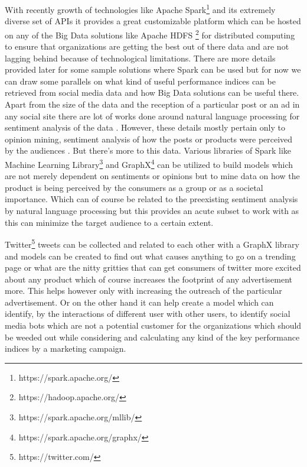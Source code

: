 \documentclass[sigconf]{acmart}
\begin{document}
With recently growth of technologies like Apache Spark\footnote{https://spark.apache.org/} and its extremely diverse set of APIs it provides a great customizable platform which can be hosted on any of the Big Data solutions like Apache HDFS \footnote{https://hadoop.apache.org/} for distributed computing to ensure that organizations are getting the best out of there data and are not lagging behind because of technological limitations. There are more details provided later for some sample solutions where Spark can be used but for now we can draw some parallels on what kind of useful performance indices can be retrieved from social media data and how Big Data solutions can be useful there. Apart from the size of the data and the reception of a particular post or an ad in any social site there are lot of works done around natural language processing for sentiment analysis of the data \cite{IJIRSTV1I11036}. However, these details mostly pertain only to opinion mining, sentiment analysis of how the posts or products were perceived by the audiences \cite{Batrinca2015}. But there's more to this data. Various libraries of Spark like Machine Learning Library\footnote{https://spark.apache.org/mllib/} and GraphX\footnote{https://spark.apache.org/graphx/} can be utilized to build models which are not merely dependent on sentiments or opinions but to mine data on how the product is being perceived by the consumers as a group or as a societal importance. Which can of course be related to the preexisting sentiment analysis by natural language processing but this provides an acute subset to work with as this can minimize the target audience to a certain extent.

Twitter\footnote{https://twitter.com/} tweets can be collected and related to each other with a GraphX library and models can be created to find out what causes anything to go on a trending page or what are the nitty gritties that can get consumers of twitter more excited about any product which of course increases the footprint of any advertisement more. This helps however only with increasing the outreach of the particular advertisement. Or on the other hand it can help create a model which can identify, by the interactions of different user with other users, to identify social media bots which are not a potential customer for the organizations which should be weeded out while considering and calculating any kind of the key performance indices by a marketing campaign.
\end{document}
